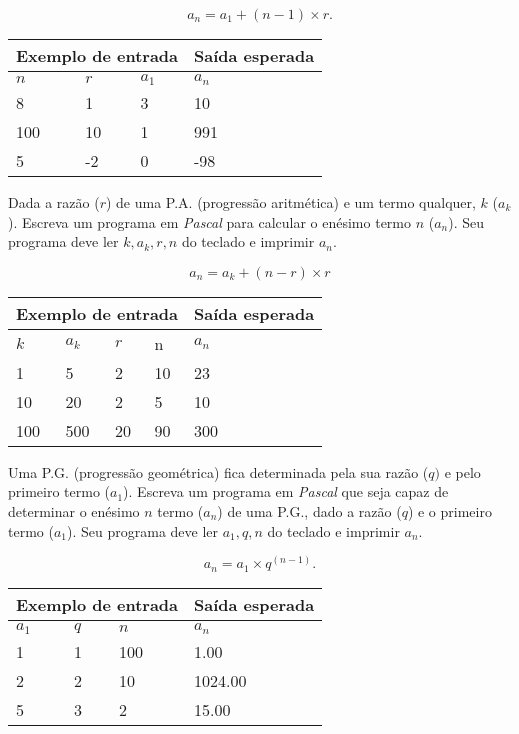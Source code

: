 \[
a_n = a_1 + (n-1)\times r.
\]

\begin{center}
\begin{tabular}{|l|l|l|l|} \hline
\multicolumn{3}{|c|}{Exemplo de entrada} & Saída esperada \\ \hline
$n$ & $r$ & $a_1$   & $a_n$               \\ \hline
8 & 1 & 3       & 10                \\ \hline
100 & 10 & 1    & 991                \\ \hline
5 & -2 & 0      & -98                \\ \hline
\end{tabular}
\end{center}

\item Dada a razão ($r$) de uma P.A. (progressão aritmética) e um termo 
qualquer, $k$ ($a_k$). Escreva um programa em \emph{Pascal} para calcular 
o enésimo termo $n$ ($a_n$). Seu programa deve ler $k, a_k, r, n$ do teclado
e imprimir $a_n$.

\[
a_n = a_k + (n-r) \times r
\]

\begin{center}
\begin{tabular}{|l|l|l|l|l|} \hline
\multicolumn{4}{|c|}{Exemplo de entrada} & Saída esperada \\ \hline
$k$ & $a_k$ & $r$ & n   & $a_n$             \\ \hline
1 & 5 & 2 & 10          & 23                \\ \hline
10 & 20 & 2 & 5         & 10                \\ \hline
100 & 500 & 20 & 90     & 300               \\ \hline
\end{tabular}
\end{center}

\item Uma P.G. (progressão geométrica) fica determinada pela sua razão ($q)$ 
e pelo primeiro termo ($a_1$). Escreva um programa em \emph{Pascal} que seja 
capaz de determinar o enésimo $n$ termo ($a_n$) de uma P.G., dado a razão ($q$) 
e o primeiro termo ($a_1$). Seu programa deve ler $a_1, q, n$ do teclado
e imprimir $a_n$.

\[
a_n = a_1 \times q^{(n-1)}.
\]

\begin{center}
\begin{tabular}{|l|l|l|l|} \hline
\multicolumn{3}{|c|}{Exemplo de entrada} & Saída esperada \\ \hline
$a_1$ & $q$ & $n$   & $a_n$               \\ \hline
1 & 1 & 100         & 1.00                \\ \hline
2 & 2 & 10          & 1024.00             \\ \hline
5 & 3 & 2           & 15.00               \\ \hline
\end{tabular}
\end{center}

